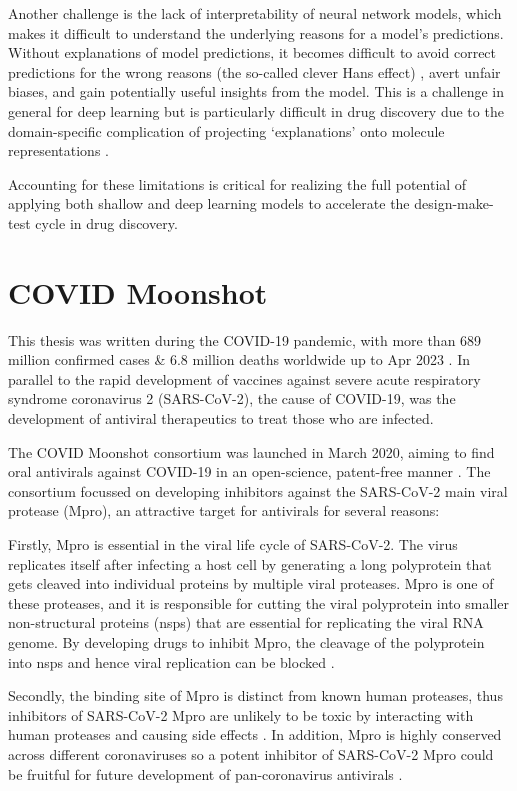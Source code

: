 Another challenge is the lack of interpretability of neural network models, which makes it difficult to understand the underlying reasons for a model's predictions. Without explanations of model predictions, it becomes difficult to avoid correct predictions for the wrong reasons (the so-called clever Hans effect) \cite{Lapuschkin2019UnmaskingCleverHans}, avert unfair biases, and gain potentially useful insights from the model. This is a challenge in general for deep learning but is particularly difficult in drug discovery due to the domain-specific complication of projecting `explanations' onto molecule representations \cite{Jimenze2020XAI}.

Accounting for these limitations is critical for realizing the full potential of applying both shallow and deep learning models to accelerate the design-make-test cycle in drug discovery.

\section{COVID Moonshot}

This thesis was written during the COVID-19 pandemic, with more than 689 million confirmed cases \& 6.8 million deaths worldwide up to Apr 2023 \cite{who_dashboard}. In parallel to the rapid development of vaccines against severe acute respiratory syndrome coronavirus 2 (SARS-CoV-2), the cause of COVID-19, was the development of antiviral therapeutics to treat those who are infected.

The COVID Moonshot consortium was launched in March 2020, aiming to find oral antivirals against COVID-19 in an open-science, patent-free manner \cite{chodera2020crowdsourcing, Moonshot2022}. The consortium focussed on developing inhibitors against the SARS-CoV-2 main viral protease (Mpro), an attractive target for antivirals for several reasons:

Firstly, Mpro is essential in the viral life cycle of SARS-CoV-2. The virus replicates itself after infecting a host cell by generating a long polyprotein that gets cleaved into individual proteins by multiple viral proteases. Mpro is one of these proteases, and it is responsible for cutting the viral polyprotein into smaller non-structural proteins (nsps) that are essential for replicating the viral RNA genome. By developing drugs to inhibit Mpro, the cleavage of the polyprotein into nsps and hence viral replication can be blocked \cite{hilgenfeld2014sars}.

Secondly, the binding site of Mpro is distinct from known human proteases, thus inhibitors of SARS-CoV-2 Mpro are unlikely to be toxic by interacting with human proteases and causing side effects \cite{jin2020structure,liu2020development}. In addition, Mpro is highly conserved across different coronaviruses so a potent inhibitor of SARS-CoV-2 Mpro could be fruitful for future development of pan-coronavirus antivirals \cite{ullrich2020sars}. 

